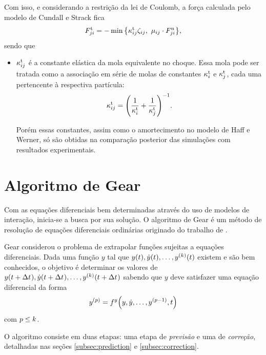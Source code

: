 Com isso, e considerando a restrição da lei de Coulomb, a força calculada pelo modelo de Cundall e Strack fica
\begin{equation*}
	\tangentialForceScalarji = - \min\Bqty{\tangentialElasticConstantij\elongationij,\,\, \dynamicFrictionij\cdot\normalForceScalarji},
\end{equation*}
sendo que
\begin{itemize}
	\item \({\kappa}_{i j}^{\text{t}}\) é a constante elástica da mola equivalente no choque. Essa mola pode ser tratada como a associação em série de molas de constantes \({\kappa}_{i}^{\text{t}}\) e \({\kappa}_{j}^{\text{t}}\), cada uma pertencente à respectiva partícula:
	\begin{equation*}
		\tangentialElasticConstantij = \pqty{\dfrac{1}{\tangentialElasticConstanti} + \dfrac{1}{\tangentialElasticConstantj}}^{-1}.
	\end{equation*}

	Porém essas constantes, assim como o amortecimento no modelo de Haff e Werner, só são obtidas na comparação posterior das simulações com resultados experimentais.
\end{itemize}

\section{Algoritmo de Gear} \label{sec:gear_integration_scheme}

Com as equações diferenciais bem determinadas através do uso de modelos de interação, inicia-se a busca por sua solução. O algoritmo de Gear é um método de resolução de equações diferenciais ordinárias originado do trabalho de .

Gear considerou o problema de extrapolar funções sujeitas a equações diferenciais. Dada uma função \(y\) tal que \(y(t), \deriv{1}{y}(t),\dotsc, \deriv{\taylorOrder}{y}(t)\) existem e são bem conhecidos, o objetivo é determinar os valores de \(y(t + \Dt), \deriv{1}{y}(t + \Dt),\dotsc, \deriv{\taylorOrder}{y}(t + \Dt)\) sabendo que \(y\) deve satisfazer uma equação diferencial da forma
\begin{equation} \label{eq:gear_diff}
	\deriv{\eqOrder}{y} = \eqFor{y}\pqty{y, \deriv{1}{y},\dotsc,\deriv{\eqOrder-1}{y}, t}
\end{equation}
com \(p \leq k\).

O algoritmo consiste em duas etapas: uma etapa de \textit{previsão} e uma de \textit{correção}, detalhadas nas seções \ref{subsec:prediction} e \ref{subsec:correction}.


